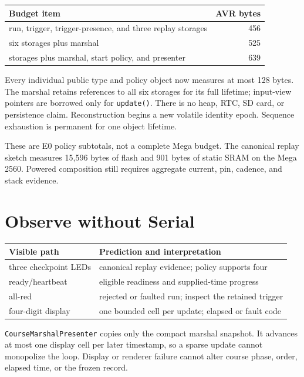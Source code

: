 \documentclass[11pt]{article}
\begin{document}
\begin{tabularx}{\linewidth}{@{}X r@{}}
\toprule
Budget item & AVR bytes\\
\midrule
run, trigger, trigger-presence, and three replay storages & 456\\
six storages plus marshal & 525\\
storages plus marshal, start policy, and presenter & 639\\
\bottomrule
\end{tabularx}

Every individual public type and policy object now measures at most 128 bytes.
The marshal retains references to all six storages for its full lifetime;
input-view pointers are borrowed only for \texttt{update()}. There is no heap,
RTC, SD card, or persistence claim. Reconstruction begins a new volatile
identity epoch. Sequence exhaustion is permanent for one object lifetime.

These are E0 policy subtotals, not a complete Mega budget. The canonical
replay sketch measures 15,596 bytes of flash and 901 bytes of static SRAM on
the Mega 2560. Powered composition still requires aggregate current, pin,
cadence, and stack evidence.

\section{Observe without Serial}
\begin{tabularx}{\linewidth}{@{}l X@{}}
\toprule
Visible path & Prediction and interpretation\\
\midrule
three checkpoint LEDs & canonical replay evidence; policy supports four\\
ready/heartbeat & eligible readiness and supplied-time progress\\
all-red & rejected or faulted run; inspect the retained trigger\\
four-digit display & one bounded cell per update; elapsed or fault code\\
\bottomrule
\end{tabularx}

\texttt{CourseMarshalPresenter} copies only the compact marshal snapshot. It
advances at most one display cell per later timestamp, so a sparse update
cannot monopolize the loop. Display or renderer failure cannot alter course
phase, order, elapsed time, or the frozen record.
\end{document}
